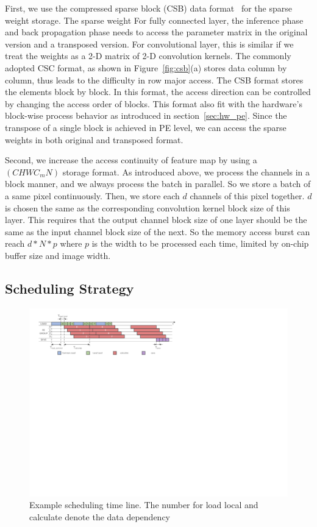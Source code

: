 First, we use the compressed sparse block (CSB) data format~\cite{bulucc2009parallel} for the sparse weight storage. The sparse weight For fully connected layer, the inference phase and back propagation phase needs to access the parameter matrix in the original version and a transposed version. For convolutional layer, this is similar if we treat the weights as a 2-D matrix of 2-D convolution kernels. The commonly adopted CSC format, as shown in Figure~\ref{fig:csb}(a) stores data column by column, thus leads to the difficulty in row major access. The CSB format stores the elements block by block. In this format, the access direction can be controlled by changing the access order of blocks. This format also fit with the hardware's block-wise process behavior as introduced in section~\ref{sec:hw_pe}. Since the transpose of a single block is achieved in PE level, we can access the sparse weights in both original and transposed format.

Second, we increase the access continuity of feature map by using a $(CHWC_mN)$ storage format. As introduced above, we process the channels in a block manner, and we always process the batch in parallel. So we store a batch of a same pixel continuously. Then, we store each $d$ channels of this pixel together. $d$ is chosen the same as the corresponding convolution kernel block size of this layer. This requires that the output channel block size of one layer should be the same as the input channel block size of the next. So the memory access burst can reach $d*N*p$ where $p$ is the width to be processed each time, limited by on-chip buffer size and image width. 

\subsection{Scheduling Strategy}

\begin{figure}[t]
  \centering
  \includegraphics[width=1.8\columnwidth]{figures/schedule.pdf}
  \caption{Example scheduling time line. The number for load local and calculate denote the data dependency}
  \label{fig:sch}
\end{figure}

